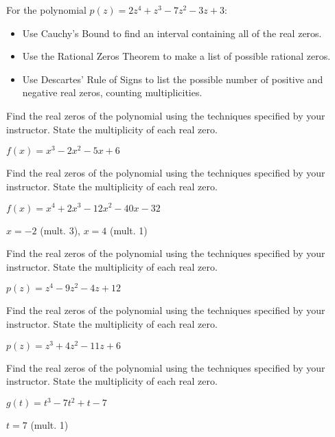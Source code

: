 \documentclass{ximera}
\begin{document}
\begin{problem}\label{prelimpolystufflast}
For the polynomial $p(z) = 2z^4+z^3-7z^2-3z+3$:

\begin{itemize}
\item  Use Cauchy's Bound to find an interval containing all of the real zeros.
\item  Use the Rational Zeros Theorem to make a list of possible rational zeros.
\item  Use Descartes' Rule of Signs to list the possible number of positive and negative real zeros, counting multiplicities.
\end{itemize}
\end{problem}

\begin{problem}\label{findrealzerosexerfirst}
Find the real zeros of the polynomial using the techniques specified by your instructor.  State the multiplicity of each real zero.

$f(x) = x^{3} - 2x^{2} - 5x + 6$
\end{problem}

\begin{problem}
Find the real zeros of the polynomial using the techniques specified by your instructor.  State the multiplicity of each real zero.

$f(x) = x^{4} + 2x^{3} - 12x^{2} - 40x - 32$

\begin{solution}
$x = -2$ (mult. 3), $x = 4$ (mult. 1)   
\end{solution}
\end{problem}

\begin{problem}
Find the real zeros of the polynomial using the techniques specified by your instructor.  State the multiplicity of each real zero.

$p(z) = z^{4} - 9z^{2} - 4z + 12$
\end{problem}

\begin{problem}
Find the real zeros of the polynomial using the techniques specified by your instructor.  State the multiplicity of each real zero.

$p(z) = z^{3} + 4z^{2} - 11z + 6$
\end{problem}

\begin{problem}
Find the real zeros of the polynomial using the techniques specified by your instructor.  State the multiplicity of each real zero.

$g(t) = t^{3} - 7t^{2} + t - 7$

\begin{solution}
$t = 7$ (mult. 1) 
\end{solution}
\end{problem}
\end{document}
